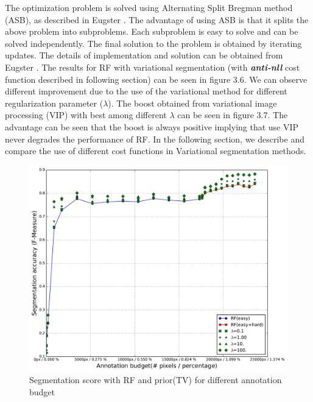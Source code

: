The optimization problem is solved using Alternating Split Bregman method (ASB), as described in Eugster \cite{dominic}. The advantage of using ASB is that it splits the above problem into subproblems. Each subproblem is easy to solve and can be solved independently. The final solution to the problem is obtained by iterating updates. The details of implementation and solution can be obtained from Eugster \cite{dominic}. The results for RF with variational segmentation (with \textbf{\textit{anti-nll}} cost function described in following section) can be seen in figure 3.6. We can observe different improvement due to the use of the variational method for different regularization parameter ($\lambda$). The boost obtained from variational image processing (VIP) with best among different $\lambda$ can be seen in figure 3.7. The advantage can be seen that the boost is always positive implying that use VIP never degrades the performance of RF. In the following section, we describe and compare the use of different cost functions in Variational segmentation methods.


\begin{figure}[h!] \label{fig:rf_vipfull}
 \includegraphics[width=1.0\linewidth]{figures/rf_vip_easy_hard_full.pdf}
\caption{Segmentation score with RF and prior(TV) for different annotation budget}
\end{figure}


